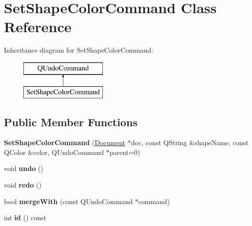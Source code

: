 \hypertarget{class_set_shape_color_command}{\section{Set\-Shape\-Color\-Command Class Reference}
\label{class_set_shape_color_command}
}
Inheritance diagram for Set\-Shape\-Color\-Command\-:\begin{figure}[H]
\begin{center}
\leavevmode
\includegraphics[height=2.000000cm]{class_set_shape_color_command}
\end{center}
\end{figure}
\subsection*{Public Member Functions}
\begin{DoxyCompactItemize}
\item 
\hypertarget{class_set_shape_color_command_a90482d92fd8eef3c7ede4f89b123f25e}{{\bfseries Set\-Shape\-Color\-Command} (\hyperlink{class_document}{Document} $\ast$doc, const Q\-String \&shape\-Name, const Q\-Color \&color, Q\-Undo\-Command $\ast$parent=0)}\label{class_set_shape_color_command_a90482d92fd8eef3c7ede4f89b123f25e}

\item 
\hypertarget{class_set_shape_color_command_a40d504113fc397bbf8babbaa4d1a9cd6}{void {\bfseries undo} ()}\label{class_set_shape_color_command_a40d504113fc397bbf8babbaa4d1a9cd6}

\item 
\hypertarget{class_set_shape_color_command_a7def84be3443857b13d53b45920baca4}{void {\bfseries redo} ()}\label{class_set_shape_color_command_a7def84be3443857b13d53b45920baca4}

\item 
\hypertarget{class_set_shape_color_command_afb06c2dfe42f71218e8be7e342485105}{bool {\bfseries merge\-With} (const Q\-Undo\-Command $\ast$command)}\label{class_set_shape_color_command_afb06c2dfe42f71218e8be7e342485105}

\item 
\hypertarget{class_set_shape_color_command_a377219af52021aa42f609e57c52607b3}{int {\bfseries id} () const }\label{class_set_shape_color_command_a377219af52021aa42f609e57c52607b3}

\end{DoxyCompactItemize}



